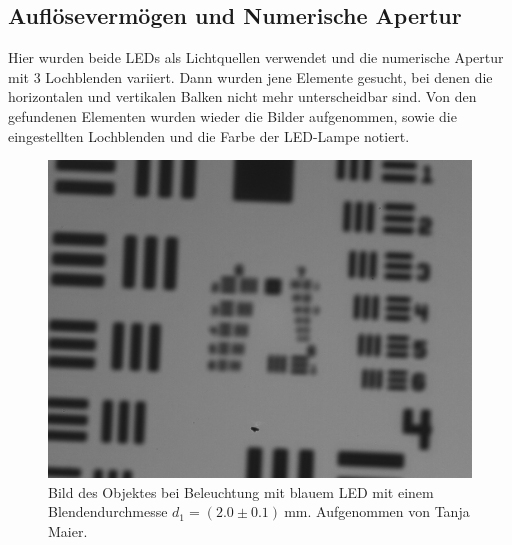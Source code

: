 \documentclass{article}
\begin{document}
\newpage


\subsection{Auflösevermögen und Numerische Apertur}



Hier wurden beide LEDs als Lichtquellen verwendet und die numerische Apertur mit 3 Lochblenden variiert. Dann wurden jene Elemente gesucht, bei denen die horizontalen und vertikalen Balken nicht mehr unterscheidbar sind. Von den gefundenen Elementen wurden wieder die Bilder aufgenommen, sowie die eingestellten Lochblenden und die Farbe der LED-Lampe notiert.


\begin{minipage}[t]{.45\textwidth}
\begin{figure}[H]
\includegraphics[scale=0.1]{tm/Bild_blau_kleine Lochblende.jpg}
\caption{Bild des Objektes bei Beleuchtung mit blauem LED mit einem Blendendurchmesse $d_1=(2.0\pm0.1)~$mm. Aufgenommen von Tanja Maier.}
\label{fig:bbild_klein_blau_tm}
\end{figure}
\end{minipage}
\hfill
\noindent
\end{document}
